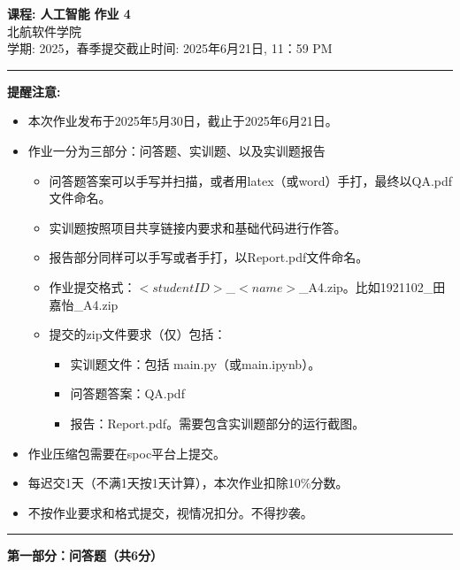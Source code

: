 \documentclass[a4paper, 11pt]{article}
\begin{document}
\begin{CJK}{UTF8}{gbsn}
\noindent
\large\textbf{课程: 人工智能} \hfill \textbf{作业 4}   \\
北航软件学院 \\
\normalsize 学期: 2025，春季\hfill 提交截止时间:  2025年6月21日, 11：59 PM \\
\noindent\rule{7in}{2.8pt}
\textbf{提醒注意:}
\begin{itemize}
\item 本次作业发布于2025年5月30日，截止于2025年6月21日。
\item 作业一分为三部分：问答题、实训题、以及实训题报告
\begin{itemize}
    \item 问答题答案可以手写并扫描，或者用latex（或word）手打，最终以QA.pdf文件命名。
    \item 实训题按照项目共享链接内要求和基础代码进行作答。
    \item 报告部分同样可以手写或者手打，以Report.pdf文件命名。
    \item 作业提交格式：$<student ID>$\_$<name>$\_A4.zip。比如1921102\_田嘉怡\_A4.zip
    \item 提交的zip文件要求（仅）包括：
    \begin{itemize}
        \item 实训题文件：包括 main.py（或main.ipynb）。
        \item 问答题答案：QA.pdf
        \item 报告：Report.pdf。需要包含实训题部分的运行截图。
    \end{itemize}
    
\end{itemize}
\item 作业压缩包需要在spoc平台上提交。
\item 每迟交1天（不满1天按1天计算），本次作业扣除10\%分数。
\item 不按作业要求和格式提交，视情况扣分。不得抄袭。
\end{itemize}

\noindent\rule{7in}{1pt}
\textbf{第一部分：问答题（共6分）}



\end{CJK}
\end{document}
